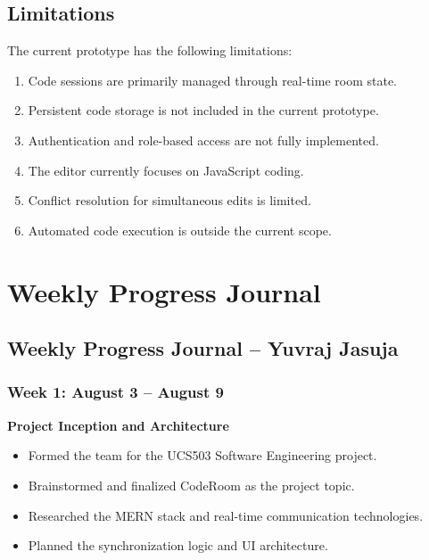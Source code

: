 \documentclass[12pt,a4paper,oneside]{report}
\begin{document}
\section{Limitations}

The current prototype has the following limitations:

\begin{enumerate}
    \item Code sessions are primarily managed through real-time room state.
    \item Persistent code storage is not included in the current prototype.
    \item Authentication and role-based access are not fully implemented.
    \item The editor currently focuses on JavaScript coding.
    \item Conflict resolution for simultaneous edits is limited.
    \item Automated code execution is outside the current scope.
\end{enumerate}

\chapter{Weekly Progress Journal}

\section{Weekly Progress Journal -- Yuvraj Jasuja}

\subsection*{Week 1: August 3 -- August 9}

\textbf{Project Inception and Architecture}

\begin{itemize}
    \item Formed the team for the UCS503 Software Engineering project.
    \item Brainstormed and finalized CodeRoom as the project topic.
    \item Researched the MERN stack and real-time communication technologies.
    \item Planned the synchronization logic and UI architecture.
\end{itemize}
\end{document}
